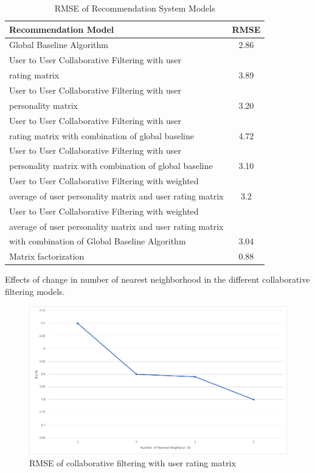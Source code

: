 \begin{center}
  \begin{table}
    \begin{tabular}{| l | c |}
      \hline
      {\bf Recommendation Model} & {\bf RMSE}\\
      \hline
      Global Baseline Algorithm & 2.86\\
      \hline
      User to User Collaborative Filtering with user & \\ rating matrix & 3.89\\
      \hline
      User to User Collaborative Filtering with user & \\ personality matrix & 3.20\\
      \hline
      User to User Collaborative Filtering with user & \\ rating matrix with combination of global baseline & 4.72\\
      \hline
      User to User Collaborative Filtering with user & \\ personality matrix with combination of global baseline & 3.10\\
      \hline
      User to User Collaborative Filtering with weighted & \\ average of user personality matrix and user rating matrix & 3.2\\
      \hline
      User to User Collaborative Filtering with weighted & \\ average of user personality matrix and user rating matrix & \\ with combination of Global Baseline Algorithm & 3.04\\
      \hline
      Matrix factorization & 0.88\\
      \hline
    \end{tabular}
    \caption{RMSE of Recommendation System Models}
  \end{table}
\end{center}

Effects of change in number of nearest neighborhood in the different collaborative filtering models.
\begin{figure}[h]
  \centering
    \includegraphics[width=1\textwidth]{fig/rmse_cf.png}
    \caption{RMSE of collaborative filtering with user rating matrix}
\end{figure}

